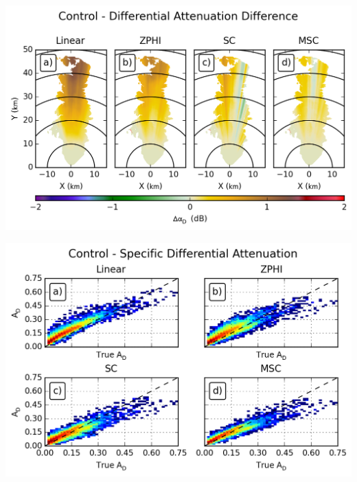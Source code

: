 \documentclass[red]{beamer}
\begin{document}
\begin{frame}
    \begin{center}
        \includegraphics[scale=0.7]{figures/C_Control_Differential_Attenuation_Difference}
    \end{center}
\end{frame}

\begin{frame}
    \begin{center}
        \includegraphics[scale=0.7]{figures/C_Control_Specific_Differential_Attenuation_scatter}
    \end{center}
\end{frame}
\end{document}
